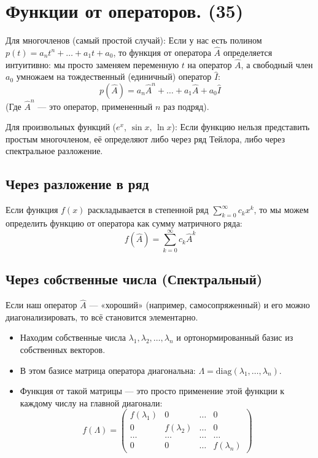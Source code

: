 \documentclass[14pt]{extreport}
\begin{document}
    \chapter{Функции от операторов. (35)}

    \begin{defbox}
        Для многочленов (самый простой случай): Если у нас есть полином $p(t) = a_n t^n + \dots + a_1 t + a_0$, то функция от оператора $\hat{A}$ определяется интуитивно: мы просто заменяем переменную $t$ на оператор $\hat{A}$, а свободный член $a_0$ умножаем на тождественный (единичный) оператор $\hat{I}$:$$p(\hat{A}) = a_n \hat{A}^n + \dots + a_1 \hat{A} + a_0 \hat{I}$$
        (Где $\hat{A}^n$ — это оператор, примененный $n$ раз подряд).
    \end{defbox}

    \begin{defbox}
        Для произвольных функций ($e^x$, $\sin x$, $\ln x$): Если функцию нельзя представить простым многочленом, её определяют либо через ряд Тейлора, либо через спектральное разложение.
    \end{defbox}

    \section{Через разложение в ряд}
    Если функция $f(x)$ раскладывается в степенной ряд $\sum_{k=0}^{\infty} c_k x^k$, то мы можем определить функцию от оператора как сумму матричного ряда:$$f(\hat{A}) = \sum_{k=0}^{\infty} c_k \hat{A}^k$$

    \section{Через собственные числа (Спектральный)}

    Если наш оператор $\hat{A}$ — «хороший» (например, самосопряженный) и его можно диагонализировать, то всё становится элементарно.

    \begin{itemize}
        \item Находим собственные числа $\lambda_1, \lambda_2, \dots, \lambda_n$ и ортонормированный базис из собственных векторов.
        \item В этом базисе матрица оператора диагональна: $\Lambda = \text{diag}(\lambda_1, \dots, \lambda_n)$.
        \item Функция от такой матрицы — это просто применение этой функции к каждому числу на главной диагонали:$$f(\Lambda) = \begin{pmatrix} f(\lambda_1) & 0 & \dots & 0 \\ 0 & f(\lambda_2) & \dots & 0 \\ \dots & \dots & \dots & \dots \\ 0 & 0 & \dots & f(\lambda_n) \end{pmatrix}$$
    \end{itemize}
\end{document}
